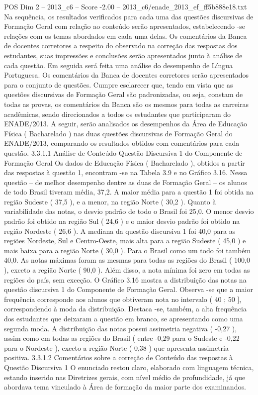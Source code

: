 \begin{textsample}{POS Dim 2 – 2013\_c6 – Score -2.00 – 2013\_c6/enade\_2013\_ef\_ff5b888e18.txt}
Na sequência, os resultados verificados para cada uma das questões discursivas de Formação Geral com relação ao conteúdo serão apresentados, estabelecendo -se relações com os temas abordados em cada uma delas.
Os comentários da Banca de docentes corretores a respeito do observado na correção das respostas dos estudantes, suas impressões e conclusões serão apresentados junto à análise de cada questão.
Em seguida será feita uma análise do desempenho de Língua Portuguesa.
Os comentários da Banca de docentes corretores serão apresentados para o conjunto de questões.
Cumpre esclarecer que, tendo em vista que as questões discursivas de Formação Geral são padronizadas, ou seja, constam de todas as provas, os comentários da Banca são os mesmos para todas as carreiras acadêmicas, sendo direcionados a todos os estudantes que participaram do ENADE/2013.
A seguir, serão analisados os desempenhos da Área de Educação Física ( Bacharelado ) nas duas questões discursivas de Formação Geral do ENADE/2013, comparando os resultados obtidos com comentários para cada questão. 3.3.1.1 Análise de Conteúdo Questão Discursiva 1 do Componente de Formação Geral Os dados de Educação Física ( Bacharelado ), obtidos a partir das respostas à questão 1, encontram -se na Tabela 3.9 e no Gráfico 3.16.
Nessa questão – de melhor desempenho dentre as duas de Formação Geral – os alunos de todo Brasil tiveram média, 37,2.
A maior média para a questão 1 foi obtida na região Sudeste ( 37,5 ), e a menor, na região Norte ( 30,2 ).
Quanto à variabilidade das notas, o desvio padrão de todo o Brasil foi 25,0.
O menor desvio padrão foi obtido na região Sul ( 24,6 ) e o maior desvio padrão foi obtido na região Nordeste ( 26,6 ).
A mediana da questão discursiva 1 foi 40,0 para as regiões Nordeste, Sul e Centro-Oeste, mais alta para a região Sudeste ( 45,0 ) e mais baixa para a região Norte ( 30,0 ).
Para o Brasil como um todo foi também 40,0.
As notas máximas foram as mesmas para todas as regiões do Brasil ( 100,0 ), exceto a região Norte ( 90,0 ).
Além disso, a nota mínima foi zero em todas as regiões do país, sem exceção.
O Gráfico 3.16 mostra a distribuição das notas na questão discursiva 1 do Componente de Formação Geral.
Observa -se que a maior frequência corresponde aos alunos que obtiveram nota no intervalo ( 40 ; 50 ], correspondendo à moda da distribuição.
Destaca -se, também, a alta frequência dos estudantes que deixaram a questão em branco, se apresentando como uma segunda moda.
A distribuição das notas possui assimetria negativa ( -0,27 ), assim como em todas as regiões do Brasil ( entre -0,29 para o Sudeste e -0,22 para o Nordeste ), exceto a região Norte ( 0,38 ) que apresenta assimetria positiva. 3.3.1.2 Comentários sobre a correção de Conteúdo das respostas à Questão Discursiva 1 O enunciado restou claro, elaborado com linguagem técnica, estando inserido nas Diretrizes gerais, com nível médio de profundidade, já que abordava tema vinculado à Área de formação da maior parte dos examinandos.

\end{textsample}
